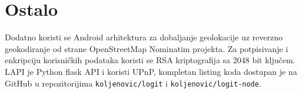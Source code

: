 \section{Ostalo}
Dodatno koristi se Android arhitektura za dobaljanje geolokacije\cite{geoa} uz reverzno geokodiranje od strane OpenStreetMap Nominatim projekta\cite{nominatim}. Za potpisivanje i enkripciju korisničkih podataka koristi se RSA\cite{rivest1978method} kriptografija sa 2048 bit ključem. LAPI je Python flask API i koristi UPnP, kompletan listing koda dostupan je na GitHub u repozitorijima \texttt{koljenovic/logit} i \texttt{koljenovic/logit-node}.